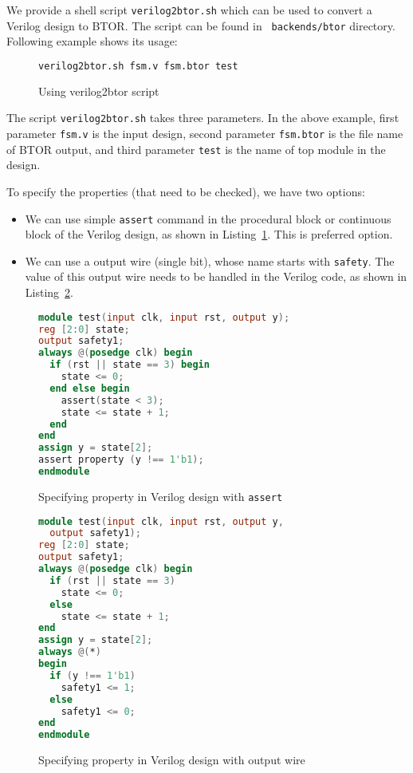\documentclass[9pt,technote,a4paper]{IEEEtran}
\begin{document}
We provide a shell script {\tt verilog2btor.sh} which can be used to
convert a Verilog design to BTOR.  The script can be found in {\tt
  backends/btor} directory.  Following example shows its usage:

\begin{figure}[H]
\begin{lstlisting}[language=sh]
verilog2btor.sh fsm.v fsm.btor test
\end{lstlisting}
 \renewcommand{\figurename}{Listing}
\caption{Using verilog2btor script}
\end{figure}

The script {\tt verilog2btor.sh} takes three parameters.  In the above
example, first parameter {\tt fsm.v} is the input design, second
parameter {\tt fsm.btor} is the file name of BTOR output, and third
parameter {\tt test} is the name of top module in the design.

To specify the properties (that need to be checked), we have two
options:
\begin{itemize}
\item We can use simple {\tt assert} command in the procedural block
  or continuous block of the Verilog design, as shown in
  Listing~\ref{specifying_property_assert}. This is preferred option.
\item We can use a output wire (single bit), whose name starts with
  {\tt safety}.  The value of this output wire needs to be handled in
  the Verilog code, as shown in
  Listing~\ref{specifying_property_output}.
\end{itemize}

\begin{figure}[H]
\begin{lstlisting}[language=Verilog]
module test(input clk, input rst, output y);
reg [2:0] state;
output safety1;
always @(posedge clk) begin
  if (rst || state == 3) begin
    state <= 0;
  end else begin
    assert(state < 3);
    state <= state + 1;
  end
end
assign y = state[2];
assert property (y !== 1'b1);
endmodule
\end{lstlisting}
\renewcommand{\figurename}{Listing}
\caption{Specifying property in Verilog design with {\tt assert}}
\label{specifying_property_assert}
\end{figure}

\begin{figure}[H]
\begin{lstlisting}[language=Verilog]
module test(input clk, input rst, output y, 
  output safety1);
reg [2:0] state;
output safety1;
always @(posedge clk) begin
  if (rst || state == 3)
    state <= 0;
  else
    state <= state + 1;
end
assign y = state[2];
always @(*)
begin
  if (y !== 1'b1)
    safety1 <= 1;
  else
    safety1 <= 0;
end
endmodule
\end{lstlisting}
\renewcommand{\figurename}{Listing}
\caption{Specifying property in Verilog design with output wire}
\label{specifying_property_output}
\end{figure}
\end{document}
